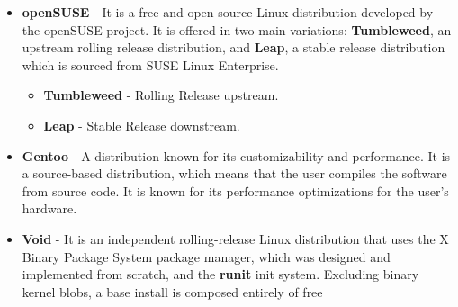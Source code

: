 \begin{itemize}
    \textbf{Arch Linux} - A community-driven distribution known for its simplicity and customizability. It is a \textit{rolling release} distribution, which means that it is continuously updated. It is a bare-bones distribution that lets the user decide which packages they want to install.
    \begin{itemize}
      \item \textbf{Manjaro} - A distribution based on Arch Linux which is known for its user friendliness. It is a rolling release distribution that is easier to install for new users. It uses a different repository for packages with additional testing.
      \item \textbf{EndeavourOS} - A distribution based on Arch Linux which is known for its simplicity and minimalism. It is a rolling release distribution that is easier to install for new users. It uses the same repository for packages as \textbf{Arch Linux}.
      \item \textbf{Artix Linux} - It uses the \textbf{OpenRC} init system instead of \textbf{systemd}. It also offers other \textit{init systems} like \textbf{runit}, \textbf{s6}, \textbf{dinit}.
    \end{itemize}
  \item
    \textbf{openSUSE} - It is a free and open-source Linux distribution developed by the openSUSE project. It is offered in two main variations: \textbf{Tumbleweed}, an upstream rolling release distribution, and \textbf{Leap}, a stable release distribution which is sourced from SUSE Linux Enterprise.
    \begin{itemize}
      \item \textbf{Tumbleweed} - Rolling Release upstream.
      \item \textbf{Leap} - Stable Release downstream.
    \end{itemize}
  \item
    \textbf{Gentoo} - A distribution known for its customizability and performance. It is a source-based distribution, which means that the user compiles the software from source code. It is known for its performance optimizations for the user's hardware.
  \item
    \textbf{Void} - It is an independent rolling-release Linux distribution that uses the X Binary Package System package manager, which was designed and implemented from scratch, and the \textbf{runit} init system. Excluding binary kernel blobs, a base install is composed entirely of free\sidenote{
}
\end{itemize}

